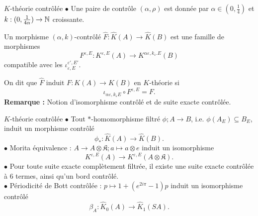 \begin{frame}{$K$-théorie contrôlée}
$\bullet$ Une paire de contrôle $(\alpha,\rho)$ est donnée par $\alpha\in (0,\frac{1}{4})$ et $k : (0,\frac{1}{4\alpha})\rightarrow \mathbb N $ croissante.
\begin{definitionfr}
Un morphisme $(\alpha,k)$-contrôlé $\hat F : \hat K(A) \rightarrow \hat K(B)$ est une famille de morphismes 
\[F^{\varepsilon,E}: K^{\varepsilon,E}(A) \rightarrow K^{\alpha\varepsilon,k_\varepsilon. E}(B)\] 
compatible avec les $\iota_{\varepsilon,E}^{\varepsilon',E'}$.
\end{definitionfr}
\vspace{0.3 cm}
On dit que $\hat F$ induit $F : K(A)\rightarrow K(B)$ en $K$-théorie si 
\[\iota_{\alpha \varepsilon,k_\varepsilon E}\circ F^{\varepsilon,E}=F.\]
\textbf{Remarque :} Notion d'isomorphisme contrôlé et de suite exacte contrôlée.
\end{frame}

\begin{frame}{$K$-théorie contrôlée}
$\bullet$ Tout $*$-homomorphisme filtré $\phi; A\rightarrow B$, i.e. $\phi(A_E)\subseteq B_E$, induit un morphisme contrôlé 
\[\phi_* : \hat K(A)\rightarrow \hat K(B).\]
$\bullet$ Morita équivalence : $A \rightarrow A\otimes\mathfrak K ; a\mapsto a\otimes e$ induit un isomorphisme
\[K^{\varepsilon,E}(A)\rightarrow K^{\varepsilon,E}(A\otimes\mathfrak K).\]
$\bullet$ Pour toute suite exacte complètement filtrée, il existe une suite exacte contrôlée à $6$ termes, ainsi qu'un bord contrôlé.\\
\vspace{0.3 cm}
$\bullet$ Périodicité de Bott contrôlée : $p\mapsto 1+(e^{2i\pi }-1)p$ induit un isomorphisme contrôlé
\[\beta_A :\hat K_0(A) \rightarrow  \hat K_1(SA).\]

\end{frame}












































